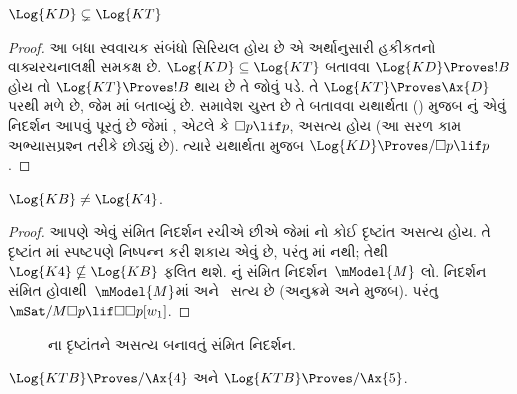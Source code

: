 \begin{prop}
  $\Log{KD} \subsetneq \Log{KT}$
\end{prop}

\begin{proof} આ બધા સ્વવાચક સંબંધો સિરિયલ હોય છે એ અર્થાનુસારી હકીકતનો
  વાક્યરચનાલક્ષી સમકક્ષ છે. $\Log{KD} \subseteq
  \Log{KT}$ બતાવવા $\Log{KD} \Proves !B$ હોય તો
  $\Log{KT} \Proves !B$ થાય છે તે જોવું પડે. તે $\Log{KT} \Proves
  \Ax{D}$ પરથી મળે છે, જેમ
  માં બતાવ્યું છે.
  સમાવેશ ચુસ્ત છે તે બતાવવા યથાર્થતા
  () મુજબ નું એવું નિદર્શન આપવું પૂરતું
  છે જેમાં , એટલે કે $\Box p \lif p$, અસત્ય હોય (આ સરળ કામ
  અભ્યાસપ્રશ્ન તરીકે છોડ્યું છે). ત્યારે યથાર્થતા મુજબ $\Log{KD}
  \Proves/ \Box p \lif p$.
\end{proof}

\begin{prop}
  $\Log{KB} \neq \Log{K4}$. 
\end{prop}

\begin{proof}
  આપણે એવું સંમિત નિદર્શન રચીએ છીએ જેમાં નો કોઈ દૃષ્ટાંત અસત્ય
  હોય. તે દૃષ્ટાંત માં સ્પષ્ટપણે નિષ્પન્ન કરી શકાય એવું છે, પરંતુ
  માં નથી; તેથી $\Log{K4} \nsubseteq \Log{KB}$ ફલિત થશે.
  નું સંમિત નિદર્શન~$\mModel{M}$ લો. નિદર્શન સંમિત
  હોવાથી~$\mModel{M}$માં  અને~ સત્ય છે
  (અનુક્રમે  અને
   મુજબ). પરંતુ
  $\mSat/{M}{\Box p \lif \Box\Box p}[w_1]$.
\end{proof}

\begin{figure}[htpb]
  \centering
  \caption{ના દૃષ્ટાંતને અસત્ય બનાવતું સંમિત નિદર્શન.}
\end{figure}
 
\begin{thm}
  $\Log{KTB} \Proves/ \Ax{4}$ અને $\Log{KTB} \Proves/ \Ax{5}$.
\end{thm}

